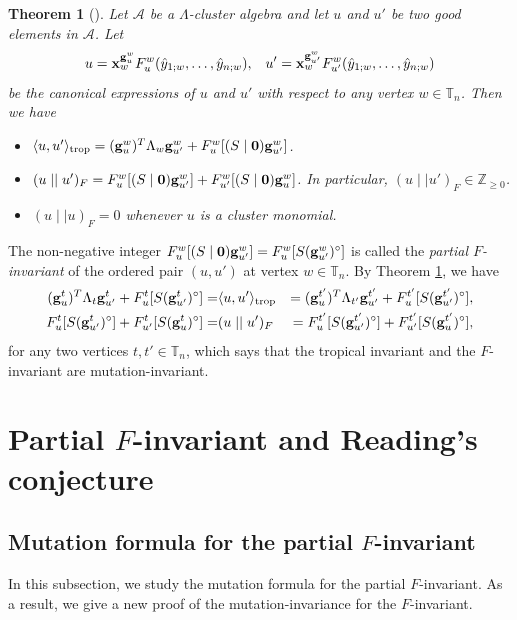 \documentclass[12pt]{amsart}
\newtheorem{theorem}{Theorem}[section]
\theoremstyle{definition}
\theoremstyle{remark}
\numberwithin{equation}{section}
\begin{document}
\begin{theorem}[{\cite[Theorem 4.10]{Cao-2023}}]
\label{thm:mutation-inv}
Let $\mathcal A$ be a $\mathsf{\Lambda}$-cluster algebra and let  $u$ and $u'$ be two good elements in  $\mathcal A$. Let
\[ u={\bf x}_w^{{\bf g}_u^w}F_u^w(\hat y_{1;w},\ldots,\hat y_{n;w}),\;\;\;u'={\bf x}_w^{{\bf g}_{u'}^w}F_{u'}^w(\hat y_{1;w},\ldots,\hat y_{n;w})
\]
be the canonical expressions of $u$ and $u'$ with respect to any vertex $w\in \mathbb T_n$. Then we have
\vspace{1mm}
\begin{itemize}
    \item [(i)] $\langle u,u'\rangle_{\rm trop}= ({\bf g}_u^w)^T\Lambda_w{\bf g}_{u'}^w+F_u^w[(S\mid {\bf 0}){\bf g}_{u'}^w]$.\vspace{1.5mm}
    \item[(ii)] $(u\mid\mid u')_F= F_u^w[(S\mid {\bf 0}){\bf g}_{u'}^w]+F_{u'}^w[(S\mid {\bf 0}){\bf g}_{u}^w]$. In particular,  $(u\mid\mid u')_F\in\mathbb Z_{\geq 0}$.\vspace{1.5mm}
    \item[(iii)] $(u\mid\mid u)_F=0$ whenever $u$ is a cluster monomial.
\end{itemize}
\end{theorem}

The non-negative integer $F_u^w[(S\mid {\bf 0}){\bf g}_{u'}^w]=F_u^w[S({\bf g}_{u'}^w)^\circ]$ is called the {\em partial $F$-invariant} of the ordered pair $(u,u')$ at vertex $w\in\mathbb T_n$.  By Theorem \ref{thm:mutation-inv}, we have
\begin{eqnarray}
({\bf g}_u^t)^T\Lambda_t{\bf g}_{u'}^t+F_u^t[S({\bf g}_{u'}^t)^\circ]   =  &\langle u,u'\rangle_{\rm trop}&= ({\bf g}_u^{t'})^T\Lambda_{t'}{\bf g}_{u'}^{t'}+F_u^{t'}[S ({\bf g}_{u'}^{t'})^\circ],\nonumber\\
F_u^t[S({\bf g}_{u'}^t)^\circ]+F_{u'}^t[S({\bf g}_{u}^t)^\circ]=&(u\mid\mid u')_F&= F_u^{t'}[S({\bf g}_{u'}^{t'})^\circ]+F_{u'}^{t'}[S({\bf g}_{u}^{t'})^\circ],\nonumber
\end{eqnarray}
for any two vertices $t,t'\in\mathbb T_n$, which says that the tropical invariant and the $F$-invariant are mutation-invariant. 




\section{Partial $F$-invariant and Reading's conjecture}\label{sec:3}

\subsection{Mutation formula for the partial $F$-invariant}
In this subsection, we study the mutation formula for the partial $F$-invariant. As a result, we give a new proof of the mutation-invariance for the $F$-invariant.
\end{document}
